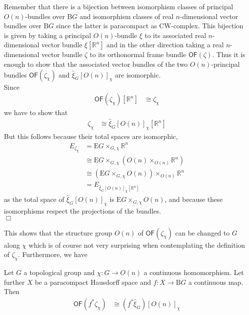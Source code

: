 \begin{prf}[Sketch]
Remember that there is a bijection between isomorphism classes of principal $O(n)$-bundles over $\mathrm{B}G$ and isomorphism classes of real $n$-dimensional vector bundles over $\mathrm{B}G$ since the latter is paracompact as CW-complex. This bijection is given by taking a principal $O(n)$-bundle $\xi$ to its associated real $n$-dimensional vector bundle $\xi[\mathbb{R}^{n}]$ and in the other direction taking a real $n$-dimensional vector bundle $\zeta$ to its orthonormal frame bundle $\mathsf{OF}(\zeta)$. Thus it is enough to show that the associated vector bundles of the two $O(n)$-principal bundles $\mathsf{OF}(\zeta_{\chi})$ and $\hat{\xi}_{G}[O(n)]_{\chi}$ are isomorphic.
\\
Since
\begin{align*}
  \mathsf{OF}(\zeta_{\chi})[\mathbb{R}^{n}]
  &\cong
  \zeta_{\chi}
\end{align*}
we have to show that
\begin{align*}
  \zeta_{\chi}
  &\cong
  \hat{\xi}_{G}[O(n)]_{\chi}[\mathbb{R}^{n}]
\end{align*}
But this follows because their total spaces are isomorphic,
\begin{align*}
  E_{\zeta_{\chi}}
  &=
  \mathrm{E}G
  \times_{G,\chi}
  \mathbb{R}^{n}
  \\
  &\cong
  \mathrm{E}G
  \times_{G,\chi}
  \left(
    O(n)
    \times_{O(n)}
    \mathbb{R}^{n}
  \right)
  \\
  &\cong
  \left(
    \mathrm{E}G
    \times_{G,\chi}
    O(n)
  \right)
  \times_{O(n)}
  \mathbb{R}^{n}
  \\
  &=
  E_{\hat{\xi}_{G}[O(n)]_{\chi}[\mathbb{R}^{n}]}
\end{align*}
as the total space of $\hat{\xi}_{G}[O(n)]_{\chi}$ is $\mathrm{E}G \times_{G,\chi} O(n)$, and because these isomorphisms respect the projections of the bundles.
\\
\phantom{proven}
\hfill
$\Box$
\end{prf}
This shows that the structure group $O(n)$ of $\mathsf{OF}(\zeta_{\chi})$ can be changed to $G$ along $\chi$ which is of course not very surprising when contemplating the definition of $\zeta_{\chi}$. Furthermore, we have
\\
\begin{lem}
\label{lem:redstrgrofpbzeta}
Let $G$ a topological group and $\chi \colon G \to O(n)$ a continuous homomorphism. Let further $X$ be a paracompact Hausdorff space and $f \colon X \to \mathrm{B}G$ a continuous map. Then 
\begin{align*}
  \mathsf{OF}(f^{\ast}\zeta_{\chi})
  &\cong
  \left(
    f^{\ast}\hat{\xi}_{G}
  \right)
  [O(n)]_{\chi}
\end{align*}
\end{lem}
